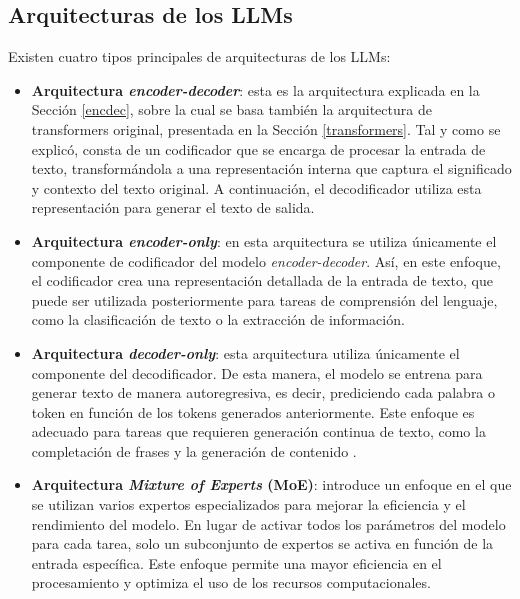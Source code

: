 \documentclass[11pt,spanish,listoffigures,listoftables]{tfgetsinf}
\begin{document}

\subsection{Arquitecturas de los LLMs}

Existen cuatro tipos principales de arquitecturas de los LLMs:

\begin{itemize}
	\item \textbf{Arquitectura \textit{encoder-decoder}}: esta es la arquitectura explicada en la Sección \ref{encdec}, sobre la cual se basa también la arquitectura de transformers original, presentada en la Sección \ref{transformers}. Tal y como se explicó, consta de un codificador que se encarga de procesar la entrada de texto, transformándola a una representación interna que captura el significado y contexto del texto original. A continuación, el decodificador utiliza esta representación para generar el texto de salida.
	\item \textbf{Arquitectura \textit{encoder-only}}: en esta arquitectura se utiliza únicamente el componente de codificador del modelo \textit{encoder-decoder}. Así, en este enfoque, el codificador crea una representación detallada de la entrada de texto, que puede ser utilizada posteriormente para tareas de comprensión del lenguaje, como la clasificación de texto o la extracción de información.
	\item \textbf{Arquitectura \textit{decoder-only}}: esta arquitectura utiliza únicamente el componente del decodificador. De esta manera, el modelo se entrena para generar texto de manera autoregresiva, es decir, prediciendo cada palabra o token en función de los tokens generados anteriormente. Este enfoque es adecuado para tareas que requieren generación continua de texto, como la completación de frases y la generación de contenido \cite{liu2018generatingwikipediasummarizinglong}.
	\item \textbf{Arquitectura \textit{Mixture of Experts} (MoE)}: introduce un enfoque en el que se utilizan varios expertos especializados para mejorar la eficiencia y el rendimiento del modelo. En lugar de activar todos los parámetros del modelo para cada tarea, solo un subconjunto de expertos se activa en función de la entrada específica. Este enfoque permite una mayor eficiencia en el procesamiento y optimiza el uso de los recursos computacionales.
\end{itemize}
\end{document}
